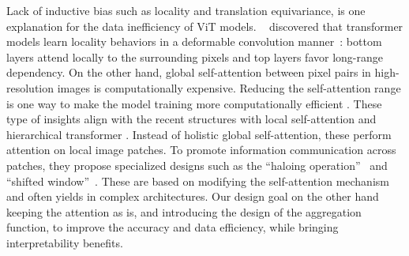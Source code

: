 \documentclass{article}
\begin{document}
Lack of inductive bias such as locality and translation equivariance, is one explanation for the data inefficiency of ViT models.  
~\citet{cordonnier2019relationship} discovered that transformer models learn locality behaviors in a deformable convolution manner~\cite{dai2017deformable}: bottom layers attend locally to the surrounding pixels and top layers favor long-range dependency. 
On the other hand, global self-attention between pixel pairs in high-resolution images is computationally expensive. 
Reducing the self-attention range is one way to make the model training more computationally efficient \cite{beltagy2020longformer}.
These type of insights align with the recent structures with local self-attention and hierarchical transformer \cite{han2021transformer,vaswani2021scaling,liu2021swin}. 
Instead of holistic global self-attention, these perform attention on local image patches. 
To promote information communication across patches, they propose specialized designs such as the ``haloing operation''~\cite{vaswani2021scaling} and ``shifted window''~\cite{liu2021swin}. These are based on modifying the self-attention mechanism and often yields in complex architectures. Our design goal on the other hand keeping the attention as is, and introducing the design of the aggregation function, to improve the accuracy and data efficiency, while bringing interpretability benefits.
\end{document}
